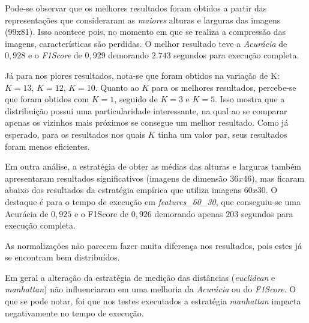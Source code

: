 \documentclass[12pt]{article}
\begin{document}
Pode-se observar que os melhores resultados foram obtidos a partir das representações que consideraram as \textit{maiores} alturas e larguras das imagens (99x81). Isso acontece pois, no momento em que se realiza a compressão das imagens, características são perdidas. O melhor resultado teve a \textit{Acurácia} de $0,928$ e o \textit{F1Score} de $0,929$ demorando $2.743$ segundos para execução completa.

Já para nos piores resultados, nota-se que foram obtidos na variação de K: $K=13$, $K=12$, $K=10$. Quanto ao $K$ para os melhores resultados, percebe-se que foram obtidos com $K=1$, seguido de $K=3$ e $K=5$. Isso mostra que a distribuição possui uma particularidade interessante, na qual ao se comparar apenas os vizinhos mais próximos se consegue um melhor resultado. Como já esperado, para os resultados nos quais $K$ tinha um valor par, seus resultados foram menos eficientes.

Em outra análise, a estratégia de obter as médias das alturas e larguras também apresentaram resultados significativos (imagens de dimensão $36x46$), mas ficaram abaixo dos resultados da estratégia empírica que utiliza imagens $60x30$. O destaque é para o tempo de execução em \textit{features\_60\_30}, que conseguiu-se uma Acurácia de $0,925$ e o F1Score de $0,926$ demorando apenas $203$ segundos para execução completa.

As normalizações não parecem fazer muita diferença nos resultados, pois estes já se encontram bem distribuídos.

Em geral a alteração da estratégia de medição das distâncias (\textit{euclidean} e \textit{manhattan}) não influenciaram em uma melhoria da \textit{Acurácia} ou do \textit{F1Score}. O que se pode notar, foi que nos testes executados a estratégia \textit{manhattan} impacta negativamente no tempo de execução.
\end{document}
